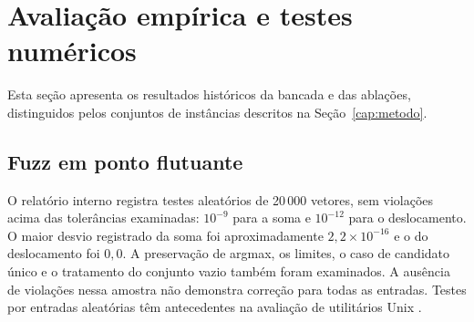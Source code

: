 \chapter{Avaliação empírica e testes numéricos}\label{cap:resultados}
Esta seção apresenta os resultados históricos da bancada e das ablações, distinguidos pelos conjuntos de instâncias descritos na Seção~\ref{cap:metodo}.
\section{Fuzz em ponto flutuante}
O relatório interno registra testes aleatórios de 20\,000 vetores, sem violações acima das tolerâncias examinadas: $10^{-9}$ para a soma e $10^{-12}$ para o deslocamento. O maior desvio registrado da soma foi aproximadamente $2{,}2\times10^{-16}$ e o do deslocamento foi $0{,}0$. A preservação de argmax, os limites, o caso de candidato único e o tratamento do conjunto vazio também foram examinados. A ausência de violações nessa amostra não demonstra correção para todas as entradas. Testes por entradas aleatórias têm antecedentes na avaliação de utilitários Unix \cite{miller1990}.
